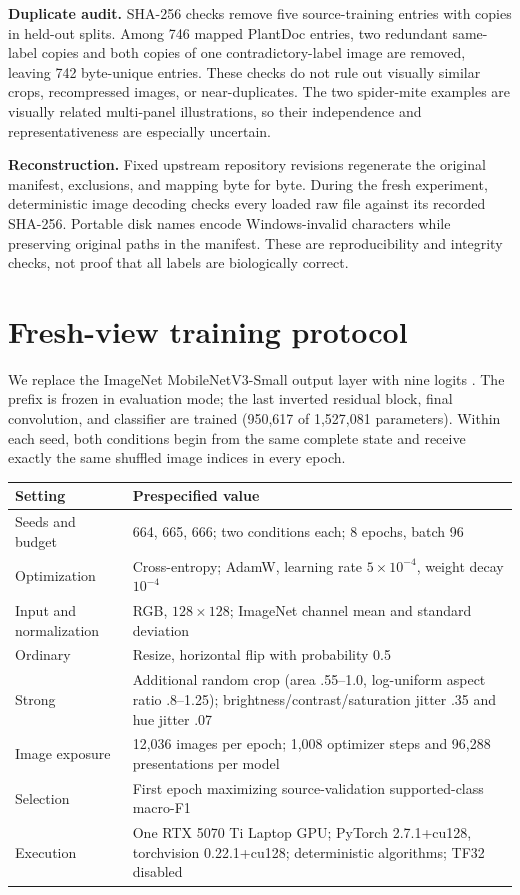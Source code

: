 \documentclass[11pt,letterpaper]{article}
\begin{document}
\textbf{Duplicate audit.} SHA-256 checks remove five source-training entries with copies in held-out splits. Among 746 mapped PlantDoc entries, two redundant same-label copies and both copies of one contradictory-label image are removed, leaving 742 byte-unique entries. These checks do not rule out visually similar crops, recompressed images, or near-duplicates. The two spider-mite examples are visually related multi-panel illustrations, so their independence and representativeness are especially uncertain.

\textbf{Reconstruction.} Fixed upstream repository revisions regenerate the original manifest, exclusions, and mapping byte for byte. During the fresh experiment, deterministic image decoding checks every loaded raw file against its recorded SHA-256. Portable disk names encode Windows-invalid characters while preserving original paths in the manifest. These are reproducibility and integrity checks, not proof that all labels are biologically correct.
\clearpage

\section{Fresh-view training protocol}
We replace the ImageNet MobileNetV3-Small output layer with nine logits \cite{mobile}. The prefix is frozen in evaluation mode; the last inverted residual block, final convolution, and classifier are trained (950,617 of 1,527,081 parameters). Within each seed, both conditions begin from the same complete state and receive exactly the same shuffled image indices in every epoch.

\begin{center}\small
\begin{tabular}{p{.27\linewidth}p{.65\linewidth}}\toprule
Setting & Prespecified value\\\midrule
Seeds and budget & 664, 665, 666; two conditions each; 8 epochs, batch 96\\
Optimization & Cross-entropy; AdamW, learning rate $5\times10^{-4}$, weight decay $10^{-4}$\\
Input and normalization & RGB, $128\times128$; ImageNet channel mean and standard deviation\\
Ordinary & Resize, horizontal flip with probability 0.5\\
Strong & Additional random crop (area .55--1.0, log-uniform aspect ratio .8--1.25); brightness/contrast/saturation jitter .35 and hue jitter .07\\
Image exposure & 12,036 images per epoch; 1,008 optimizer steps and 96,288 presentations per model\\
Selection & First epoch maximizing source-validation supported-class macro-F1\\
Execution & One RTX 5070 Ti Laptop GPU; PyTorch 2.7.1+cu128, torchvision 0.22.1+cu128; deterministic algorithms; TF32 disabled\\\bottomrule
\end{tabular}
\end{center}
\end{document}
